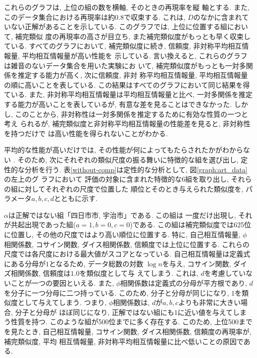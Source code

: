 これらのグラフは, 上位の組の数を横軸, そのときの再現率を縦
軸とする. また, このデータ集合における再現率は約$0.8$で収束する. 
これは, $D$のなかに含まれていない正解があることを示している. 
このグラフでは, 上位に位置する組において, 補完類似
度の再現率の高さが目立ち, また補完類似度がもっとも早く収束している. 
すべてのグラフにおいて, 補完類似度に続き, 
信頼度, 非対称平均相互情報量, 平均相互情報量が高い性能を
示している. 言い換えると, これらのグラフは雑音のないデータ集合を用いた実験にお
いて, 補完類似度がもっとも一対多関係を推定する能力が高く, 次に信頼度, 非対
称平均相互情報量, 平均相互情報量の順に高いことを表している. 
この結果はすべてのグラフにおいて同じ結果を得ている. 
また, 非対称平均相互情報量は平均相互情報量と比べ, 
一対多関係を推定する能力が高いことを表しているが, 
有意な差を見ることはできなかった. 
しかし, このことから, 非対称性は一対多関係を推定するために有効な性質の一つと考え
られるが, 補完類似度と非対称平均相互情報量の性能差を見ると, 非対称性を持つだけで
は高い性能を得られないことがわかる. 

平均的な性能が高いだけでは, その性能が何によってもたらされたかがわからない
. 
そのため, 次にそれぞれの類似尺度の振る舞いに特徴的な組を選び出し, 定性的な分析を行う. 
表\ref{without-comp}は定性的な分析として, 図\ref{graph:art_data}の左上のグ
ラフにおいて
評価の対象に含まれた特徴的な6組を取り出し, それらの組に対してそれぞれの尺度で位置した
順位とそのとき与えられた類似度を, パラメータ$a,b,c,d$とともに示す. 

$\alpha$は正解ではない組「四日市市, 宇治市」である. この組は
一度だけ出現し, それが共起出現であった組($a=1,b=0,c=0$)である. 
この組は補完類似度では625位に位置し, その他の尺度ではより高い順位に位置する. 
特に, 自己相互情報量, $\phi$相関係数, コサイン関数, 
ダイス相関係数, 信頼度では上位に位置する. 
これらの尺度では各尺度における最大値がスコアとなっている. 
自己相互情報量は定義式にある分母が$1$となるため, データ総数の対数
$\log n$を与え, コサイン関数, ダイズ相関係数, 信頼度は$1.0$を類似度として与
えてしまう. これは, $d$を考慮していないことが一つの要因といえる. 
また, $\phi$相関係数は定義式の分母が平方根であり, $d$を分子に一つ分母に二つ持っている. 
このため, 分子と分母が同じになり, $1$を類似度として与えてしまう. 
つまり, $\phi$相関係数は, $d$が$a,b,c$よりも非常に大きい場合, 分子と分母が
ほぼ同じになり, 正解ではない組にも$1$に近い値を与えてしまう性質を持つ. 
このような組が500位までに多く存在する. このため, 上位500までを見たとき, 
自己相互情報量, コサイン関数, ダイス相関係数, 信頼度の再現率が, 補完類似度, 平均
相互情報量, 非対称平均相互情報量に比べ低いことの原因である. 

